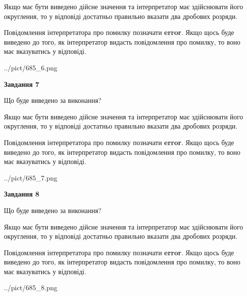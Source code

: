 \documentclass[12pt, ukrainian]{article}
\begin{document}
{\begin {Large}
Якщо має бути виведено дійсне значення та інтерпретатор має здійснювати його округлення, 
то у відповіді достатньо правильно вказати два дробових розряди.

Повідомлення інтерпретатора про помилку позначати \textbf{error}.
Якщо щось буде виведено до того, як інтерпретатор видасть повідомлення про помилку, 
то воно має вказуватись у відповіді. \par

\begin{center}
	{../pict/685_6.png}
\end{center}
\newpage

{\begin {center}\textbf{Завдання 7}\end {center}}\par
Що буде виведено за виконання? \par

Якщо має бути виведено дійсне значення та інтерпретатор має здійснювати його округлення, 
то у відповіді достатньо правильно вказати два дробових розряди.

Повідомлення інтерпретатора про помилку позначати \textbf{error}.
Якщо щось буде виведено до того, як інтерпретатор видасть повідомлення про помилку, 
то воно має вказуватись у відповіді. \par

\begin{center}
	{../pict/685_7.png}
\end{center}
\newpage

{\begin {center}\textbf{Завдання 8}\end {center}}\par
Що буде виведено за виконання? \par

Якщо має бути виведено дійсне значення та інтерпретатор має здійснювати його округлення, 
то у відповіді достатньо правильно вказати два дробових розряди.

Повідомлення інтерпретатора про помилку позначати \textbf{error}.
Якщо щось буде виведено до того, як інтерпретатор видасть повідомлення про помилку, 
то воно має вказуватись у відповіді. \par

\begin{center}
	{../pict/685_8.png}
\end{center}
\newpage


\end{Large}}
\end{document}

